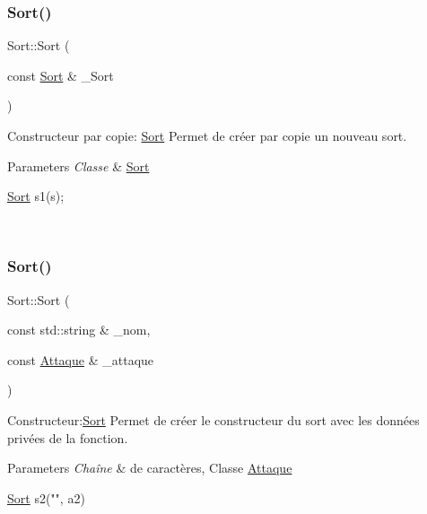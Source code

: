 \subsubsection{\texorpdfstring{Sort()}{Sort()}\hspace{0.1cm}{\footnotesize\ttfamily [2/3]}}
{\footnotesize\ttfamily Sort\+::\+Sort (\begin{DoxyParamCaption}\item[{const \hyperlink{classSort}{Sort} \&}]{\+\_\+\+Sort }\end{DoxyParamCaption})}



Constructeur par copie\+: \hyperlink{classSort}{Sort} Permet de créer par copie un nouveau sort. 


\begin{DoxyParams}{Parameters}
{\em Classe} & \hyperlink{classSort}{Sort} 
\begin{DoxyCode}
\hyperlink{classSort}{Sort} s1(s);
\end{DoxyCode}
 \\
\hline
\end{DoxyParams}
\mbox{\label{classSort_ac50c836a5f2a6a74665a898d4af24e0a}} 
\subsubsection{\texorpdfstring{Sort()}{Sort()}\hspace{0.1cm}{\footnotesize\ttfamily [3/3]}}
{\footnotesize\ttfamily Sort\+::\+Sort (\begin{DoxyParamCaption}\item[{const std\+::string \&}]{\+\_\+nom,  }\item[{const \hyperlink{classAttaque}{Attaque} \&}]{\+\_\+attaque }\end{DoxyParamCaption})}



Constructeur\+:\hyperlink{classSort}{Sort} Permet de créer le constructeur du sort avec les données privées de la fonction. 


\begin{DoxyParams}{Parameters}
{\em Chaîne} & de caractères, Classe \hyperlink{classAttaque}{Attaque} 
\begin{DoxyCode}
\hyperlink{classSort}{Sort} s2(\textcolor{stringliteral}{""}, a2)
\end{DoxyCode}
 \\
\hline
\end{DoxyParams}


